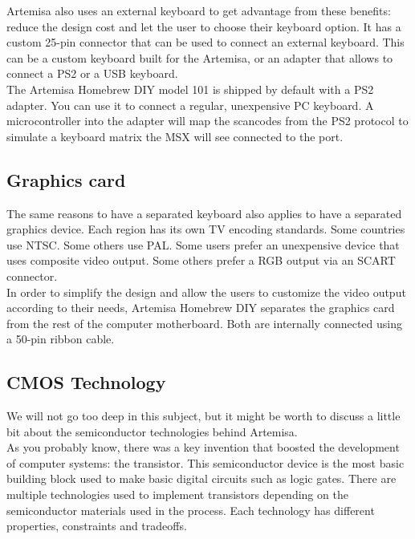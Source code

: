 Artemisa also uses an external keyboard to get advantage from these benefits: reduce the design cost and let the user to choose their keyboard option. It has a custom 25-pin connector that can be used to connect an external keyboard. This can be a custom keyboard built for the Artemisa, or an adapter that allows to connect a PS2 or a USB keyboard. \\

The Artemisa Homebrew DIY model 101 is shipped by default with a PS2 adapter. You can use it to connect a regular, unexpensive PC keyboard. A microcontroller into the adapter will map the scancodes from the PS2 protocol to simulate a keyboard matrix the MSX will see connected to the port.

\subsection{Graphics card}

The same reasons to have a separated keyboard also applies to have a separated graphics device. Each region has its own TV encoding standards. Some countries use NTSC. Some others use PAL. Some users prefer an unexpensive device that uses composite video output. Some others prefer a RGB output via an SCART connector. \\

In order to simplify the design and allow the users to customize the video output according to their needs, Artemisa Homebrew DIY separates the graphics card from the rest of the computer motherboard. Both are internally connected using a 50-pin ribbon cable.

\subsection{CMOS Technology}

We will not go too deep in this subject, but it might be worth to discuss a little bit about the semiconductor technologies behind Artemisa. \\

As you probably know, there was a key invention that boosted the development of computer systems: the transistor. This semiconductor device is the most basic building block used to make basic digital circuits such as logic gates. There are multiple technologies used to implement transistors depending on the semiconductor materials used in the process. Each technology has different properties, constraints and tradeoffs. \\

